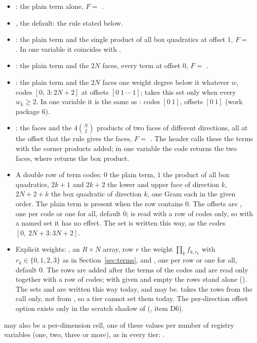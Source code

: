 \begin{itemize}\setlength\itemsep{0pt}
\item {}: the plain term alone, $F=$ .
\item {}, the default: the rule stated below.
\item {}: the plain term and the single product of all box quadratics at offset $1$, $F=$ . In one variable it coincides with .
\item {}: the plain term and the $2N$ faces, every term at offset $0$, $F=$ .
\item {}: the plain term and the $2N$ faces one weight degree below it whatever $w$, codes $[0,\ 3{:}2N+2]$ at offsets $[0\ 1\ \cdots\ 1]$;  takes this set only when every $w_k\ge2$. In one variable it is the same as : codes $[0\ 1]$, offsets $[0\ 1]$ (work package 6).
\item {}: the faces and the $4\binom N2$ products of two faces of different directions, all at the offset that the rule  gives the faces, $F=$ . The header calls these the  terms with the corner products added; in one variable the code returns the two faces, where  returns the box product.
\item A double row of term codes: $0$ the plain term, $1$ the product of all box quadratics, $2k+1$ and $2k+2$ the lower and upper face of direction $k$, $2N+2+k$ the box quadratic of direction $k$, one Gram each in the given order. The plain term is present when the row contains $0$. The offsets are , one per code or one for all, default $0$;  is read with a row of codes only, so with a named set it has no effect. The set  is written this way, as the codes $[0,\ 2N+3{:}3N+2]$.
\item Explicit weights: , an $R\times N$ array, row $r$ the weight $\prod_kf_{k,r_k}$ with $r_k\in\{0,1,2,3\}$ as in Section~\ref{sec:terms}, and , one per row or one for all, default $0$. The rows are added after the terms of the codes and are read only together with a row of codes; with  given and empty the rows stand alone (). The sets  and  are written this way today, and  may be.  takes the rows from the call only, not from , so a tier cannot set them today. The per-direction offset option  exists only in the scratch shadow of  (, item D6).
\end{itemize}
 may also be a per-dimension cell, one of these values per number of registry variables (one, two, three or more), as in every tier: .

